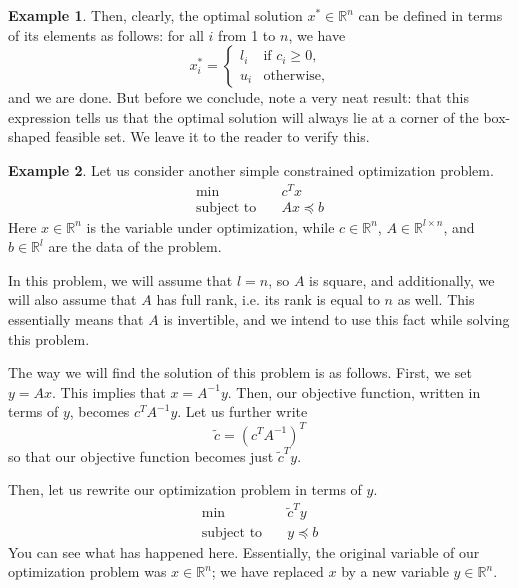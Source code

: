 \documentclass[a4paper]{article}
\theoremstyle{definition}
\newtheorem{example}{Example}[subsection]
\begin{document}
\begin{example}
	Then, clearly, the optimal solution $x^* \in \mathbb{R}^n$ can be defined in terms of its elements as follows: for all $i$ from 1 to $n$, we have
	\begin{equation*}
		x_i^* =
		\begin{cases}
			l_i & \text{if } c_i \geq 0, \\
			u_i & \text{otherwise},
		\end{cases}
	\end{equation*}
	and we are done.
	But before we conclude, note a very neat result: that this expression tells us that the optimal solution will always lie at a corner of the box-shaped feasible set.
	We leave it to the reader to verify this.
\end{example}

\begin{example}
	Let us consider another simple constrained optimization problem.
	\begin{align*}
		\min \quad & c^T x \\
		\text{subject to} \quad & Ax \preceq b
	\end{align*}
	Here $x \in \mathbb{R}^n$ is the variable under optimization, while $c \in \mathbb{R}^n$, $A \in \mathbb{R}^{l \times n}$, and $b \in \mathbb{R}^l$ are the data of the problem.

	In this problem, we will assume that $l = n$, so $A$ is square, and additionally, we will also assume that $A$ has full rank, i.e. its rank is equal to $n$ as well.
	This essentially means that $A$ is invertible, and we intend to use this fact while solving this problem.

	The way we will find the solution of this problem is as follows.
	First, we set $y = Ax$.
	This implies that $x = A^{-1} y$.
	Then, our objective function, written in terms of $y$, becomes $c^T A^{-1} y$.
	Let us further write
	\begin{equation*}
		\tilde{c} = ( c^T A^{-1} )^T
	\end{equation*}
	so that our objective function becomes just $\tilde{c}^T y$.

	Then, let us rewrite our optimization problem in terms of $y$.
	\begin{align*}
		\min \quad & \tilde{c}^T y \\
		\text{subject to} \quad & y \preceq b
	\end{align*}
	You can see what has happened here.
	Essentially, the original variable of our optimization problem was $x \in \mathbb{R}^n$; we have replaced $x$ by a new variable $y \in \mathbb{R}^n$.


\end{example}
\end{document}
